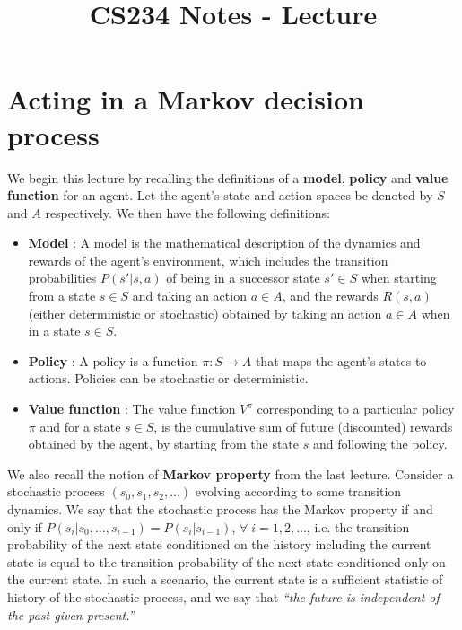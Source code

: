 \documentclass{article}
\title{CS234 Notes - Lecture \lecturenum \\ \lecturetitle }
\author{ \lecturescribe }
\theoremstyle{definition}
\theoremstyle{remark}
\begin{document}
\maketitle

\section{Acting in a Markov decision process}
\label{lecture2-MDP-known}
We begin this lecture by recalling the definitions of a \textbf{model}, \textbf{policy} and \textbf{value function} for an agent. Let the agent's state and action spaces be denoted by $S$ and $A$ respectively. We then have the following definitions:

\begin{itemize}
\item \textbf{Model} : A model is the mathematical description of the dynamics and rewards of the agent's environment, which includes the transition probabilities $P(s'|s,a)$ of being in a successor state $s' \in S$ when starting from a state $s \in S$ and taking an action $a \in A$, and the rewards $R(s,a)$ (either deterministic or stochastic) obtained by taking an action $a \in A$ when in a state $s \in S$.

\item \textbf{Policy} : A policy is a function $\pi : S \rightarrow A$ that maps the agent's states to actions. Policies can be stochastic or deterministic.

\item \textbf{Value function} : The value function $V^{\pi}$ corresponding to a particular policy $\pi$ and for a state $s \in S$, is the cumulative sum of future (discounted) rewards obtained by the agent, by starting from the state $s$ and following the policy.
\end{itemize}

We also recall the notion of \textbf{Markov property} from the last lecture. Consider a stochastic process $(s_0, s_1, s_2, \dots)$ evolving according to some transition dynamics. We say that the stochastic process has the Markov property if and only if $P(s_i|s_0,\dots,s_{i-1}) = P(s_i|s_{i-1})$, $\forall \; i = 1,2,\dots$, i.e. the transition probability of the next state conditioned on the history including the current state is equal to the transition probability of the next state conditioned only on the current state. In such a scenario, the current state is a sufficient statistic of history of the stochastic process, and we say that \textit{``the future is independent of the past given present.''}
\end{document}
